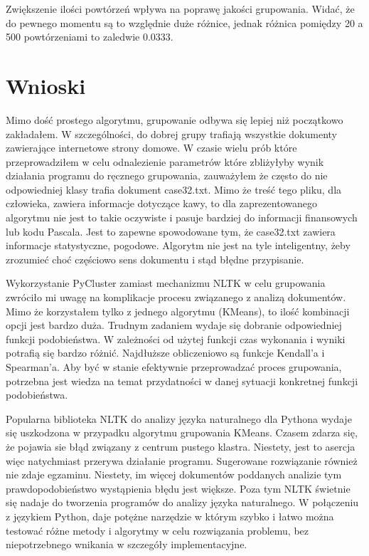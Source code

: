 \documentclass{article}
\begin{document}
\begin{center}
\end{center}

Zwiększenie ilości powtórzeń wpływa na poprawę jakości grupowania. Widać, że do pewnego momentu są to względnie duże różnice, jednak różnica pomiędzy 20 a 500 powtórzeniami to zaledwie 0.0333.

\section{Wnioski}
Mimo dość prostego algorytmu, grupowanie odbywa się lepiej niż początkowo zakładałem. W szczególności, do dobrej grupy trafiają wszystkie dokumenty zawierające internetowe strony domowe. W czasie wielu prób które przeprowadziłem w celu odnalezienie parametrów które zbliżyłyby wynik działania programu do ręcznego grupowania, zauważyłem że często do nie odpowiedniej klasy trafia dokument case32.txt. Mimo że treść tego pliku, dla człowieka, zawiera informacje dotyczące kawy, to dla zaprezentowanego algorytmu nie jest to takie oczywiste i pasuje bardziej do informacji finansowych lub kodu Pascala. Jest to zapewne spowodowane tym, że case32.txt zawiera informacje statystyczne, pogodowe. Algorytm nie jest na tyle inteligentny, żeby zrozumieć choć częściowo sens dokumentu i stąd błędne przypisanie.

Wykorzystanie PyCluster zamiast mechanizmu NLTK w celu grupowania zwróciło mi uwagę na komplikacje procesu związanego z analizą dokumentów. Mimo że korzystałem tylko z jednego algorytmu (KMeans), to ilość kombinacji opcji jest bardzo duża. Trudnym zadaniem wydaje się dobranie odpowiedniej funkcji podobieństwa. W zależności od użytej funkcji czas wykonania i wyniki potrafią się bardzo różnić. Najdłuższe obliczeniowo są funkcje Kendall'a i Spearman'a.
Aby być w stanie efektywnie przeprowadzać proces grupowania, potrzebna jest wiedza na temat przydatności w danej sytuacji konkretnej funkcji podobieństwa.

Popularna biblioteka NLTK do analizy języka naturalnego dla Pythona wydaje się uszkodzona w przypadku algorytmu grupowania KMeans. Czasem zdarza się, że pojawia sie błąd związany z centrum pustego klastra. Niestety, jest to asercja więc natychmiast przerywa działanie programu. Sugerowane rozwiązanie również nie zdaje egzaminu. Niestety, im więcej dokumentów poddanych analizie tym prawdopodobieństwo wystąpienia błędu jest większe. Poza tym NLTK świetnie się nadaje do tworzenia programów do analizy języka naturalnego. W połączeniu z językiem Python, daje potężne narzędzie w którym szybko i łatwo można testować różne metody i algorytmy w celu rozwiązania problemu, bez niepotrzebnego wnikania w szczegóły implementacyjne.
\end{document}
